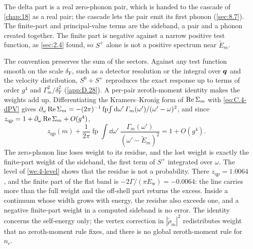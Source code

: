 The delta part is a real zero-phonon pair, which is handed to the cascade of \cref{chap:18} as a real pair; the cascade lets the pair emit its first phonon (\cref{sec:8.7}). The finite-part and principal-value terms are the sideband, a pair and a phonon created together. The finite part is negative against a narrow positive test function, as \cref{sec:2.4} found, so $S^+$ alone is not a positive spectrum near $\tilde E_m$.

The convention preserves the sum of the sectors. Against any test function smooth on the scale $\delta_{\mathrm{F}}$, such as a detector resolution or the integral over $\bm{q}$ and the velocity distribution, $S^0 + S^+$ reproduces the exact response up to terms of order $g^4$ and $\varGamma_m^2/\delta_{\mathrm{F}}^2$ (\cref{app:D.28}). A per-pair zeroth-moment identity makes the weights add up. Differentiating the Kramers--Kronig form of $\operatorname{Re}\Sigma_m$ with \cref{eq:C.4-dPV} gives $\partial_\omega\operatorname{Re}\Sigma_m = -(2\pi)^{-1}\operatorname{fp}\!\int\mathrm{d}\omega'\,\varGamma_m(\omega')/(\omega' - \omega)^2$, and since $z_{\mathrm{qp}} = 1 + \partial_\omega\operatorname{Re}\Sigma_m + O(g^4)$,
\begin{equation}
  z_{\mathrm{qp}}(m) + \frac{1}{2\pi}\operatorname{fp}\!\int\dd\omega'\,\frac{\varGamma_m(\omega')}{(\omega' - \tilde E_m)^2} = 1 + O(g^4) .
  \label{eq:8.6-zsum}
\end{equation}
The zero-phonon line loses weight to its residue, and the lost weight is exactly the finite-part weight of the sideband, the first term of $S^+$ integrated over $\omega$. The level of \cref{we:4-level} shows that the residue is not a probability. There $z_{\mathrm{qp}} = 1.0064$, and the finite part of the flat band is $-2\varGamma/(\pi E_{\mathrm{w}}) = -0.0064$: the line carries more than the full weight and the off-shell part returns the excess. Inside a continuum whose width grows with energy, the residue also exceeds one, and a negative finite-part weight in a computed sideband is no error. The identity concerns the self-energy only; the vertex correction in $|\tilde\rho_m|^2$ redistributes weight that no zeroth-moment rule fixes, and there is no global zeroth-moment rule for $n_e$.

